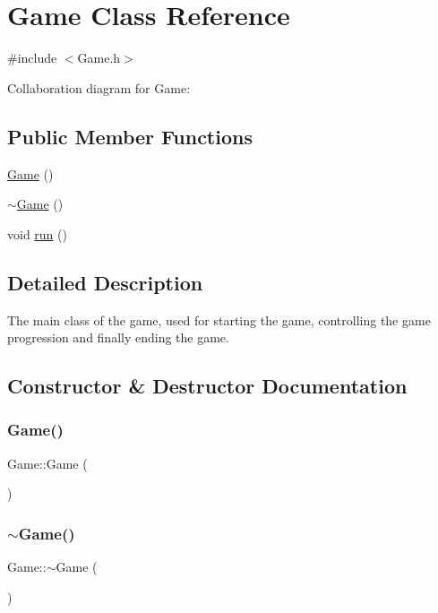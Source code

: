 \hypertarget{classGame}{}\section{Game Class Reference}
\label{classGame}


{\ttfamily \#include $<$Game.\+h$>$}



Collaboration diagram for Game\+:
\subsection*{Public Member Functions}
\begin{DoxyCompactItemize}
\item 
\hyperlink{classGame_ad59df6562a58a614fda24622d3715b65}{Game} ()
\item 
\hyperlink{classGame_ae3d112ca6e0e55150d2fdbc704474530}{$\sim$\+Game} ()
\item 
void \hyperlink{classGame_a1ab78f5ed0d5ea879157357cf2fb2afa}{run} ()
\end{DoxyCompactItemize}


\subsection{Detailed Description}
The main class of the game, used for starting the game, controlling the game progression and finally ending the game. 

\subsection{Constructor \& Destructor Documentation}
\mbox{\label{classGame_ad59df6562a58a614fda24622d3715b65}} 
\subsubsection{\texorpdfstring{Game()}{Game()}}
{\footnotesize\ttfamily Game\+::\+Game (\begin{DoxyParamCaption}{ }\end{DoxyParamCaption})}

\mbox{\label{classGame_ae3d112ca6e0e55150d2fdbc704474530}} 
\subsubsection{\texorpdfstring{$\sim$\+Game()}{~Game()}}
{\footnotesize\ttfamily Game\+::$\sim$\+Game (\begin{DoxyParamCaption}{ }\end{DoxyParamCaption})}



